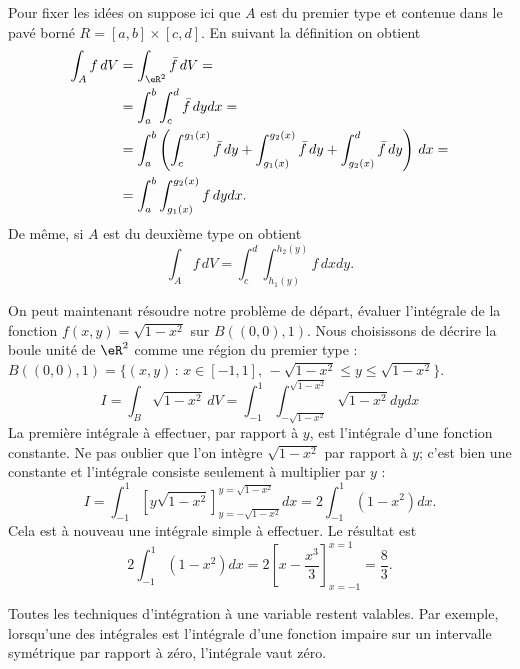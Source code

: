 Pour fixer les idées on suppose ici que \( A\) est du premier type et contenue dans le pavé borné \( R=[a,b]\times [c,d]\). En suivant la définition on obtient
\begin{equation}
	\begin{aligned}
		\int_A f\, dV & =\int_{\eR^2} \bar f\, dV=                                                                                              \\
		              & = \int_a^b\int_c^d \bar f\, dy dx=                                                                                      \\
		              & = \int_a^b\left(\int_c^{g_1(x)} \bar f\, dy+\int_{g_1(x)}^{g_2(x)} \bar f\, dy+\int_{g_2(x)}^d \bar f\, dy\right)\, dx= \\
		              & = \int_a^b\int_{g_1(x)}^{g_2(x)}  f\, dy dx.
	\end{aligned}
\end{equation}
De même, si \( A\) est du deuxième type on obtient
\begin{equation}
	\int_A f\, dV=\int_c^d\int_{h_1(y)}^{h_2(y)}  f\, dx dy.
\end{equation}
\begin{example}
	On peut maintenant résoudre notre problème de départ, évaluer l'intégrale de la fonction \( f(x,y)=\sqrt{1-x^2}\) sur \( B((0,0),1)\). Nous choisissons de décrire la boule unité de \( \eR^2\) comme une région du premier type : \( B((0,0),1)=\{(x,y)\, :\, x\in[-1,1], \, -\sqrt{1-x^2}\leq y\leq \sqrt{1-x^2} \}\).
	\begin{equation}
		I=\int_{B}\sqrt{1-x^2}\, dV=\int_{-1}^1\int_{-\sqrt{1-x^2}}^{\sqrt{1-x^2}}\sqrt{1-x^2}dydx
	\end{equation}
	La première intégrale à effectuer, par rapport à \( y\), est l'intégrale d'une fonction constante. Ne pas oublier que l'on intègre \( \sqrt{1-x^2}\) par rapport à \( y\); c'est bien une constante et l'intégrale consiste seulement à multiplier par \( y\) :
	\begin{equation}
		I=\int_{-1}^1\left[ y\sqrt{1-x^2} \right]_{y=-\sqrt{1-x^2}}^{y=\sqrt{1-x^2}}dx=2\int_{-1}^1(1-x^2)dx.
	\end{equation}
	Cela est à nouveau une intégrale simple à effectuer. Le résultat est
	\begin{equation}
		2\int_{-1}^1(1-x^2)dx=2\left[ x-\frac{ x^3 }{ 3 } \right]_{x=-1}^{x=1}=\frac{ 8 }{ 3 }.
	\end{equation}
\end{example}
\begin{remark}
	Toutes les techniques d'intégration à une variable restent valables. Par exemple, lorsqu'une des intégrales est l'intégrale d'une fonction impaire sur un intervalle symétrique par rapport à zéro, l'intégrale vaut zéro.
\end{remark}

